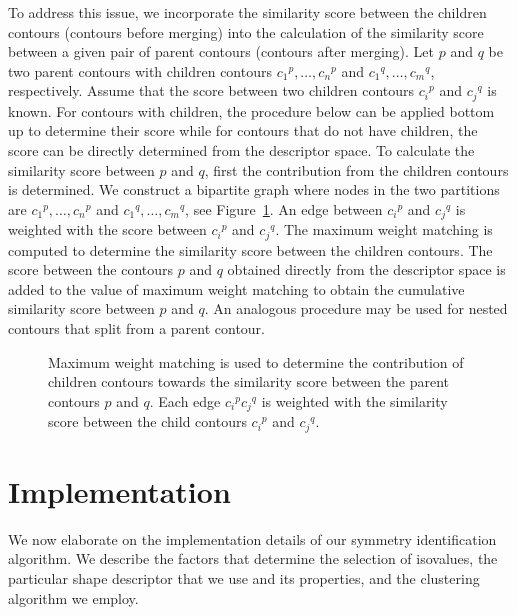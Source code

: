 \documentclass[review,journal]{vgtc}         %
\begin{document}
To address this issue, we incorporate the similarity score between the children contours 
(contours before merging) into the calculation of the similarity score between a given pair
of parent contours (contours after merging). Let $p$ and $q$ be two parent contours
with children contours ${c_1}^p,\dots,{c_n}^p$ and ${c_1}^q,\dots,{c_m}^q$, respectively. 
Assume that the score between two
children contours ${c_i}^p$ and ${c_j}^q$ is known. For contours with children,
the procedure below can be applied bottom up to determine their score
while for contours that do not have children, the score can be directly 
determined from the descriptor space. To calculate the similarity score
between $p$ and $q$, first the contribution from the children contours 
is determined. We construct a bipartite graph where nodes in the two partitions
are ${c_1}^p,\dots,{c_n}^p$ and ${c_1}^q,\dots,{c_m}^q$,
see Figure~\ref{bip}. An edge between ${c_i}^p$ and ${c_j}^q$ is weighted
with the score between ${c_i}^p$ and ${c_j}^q$. The maximum weight
matching is computed to determine the similarity score between the children
contours. The score between the contours $p$ and $q$ obtained
directly from the descriptor space is added to the value of maximum weight matching
to obtain the cumulative similarity score between $p$ and $q$. An analogous procedure
may be used for nested contours that split from a parent contour.
\begin{figure}[b]
\centering
\caption{\label{bip}Maximum weight matching is used to determine the contribution of children
	contours towards the similarity score between the parent contours $p$ and $q$. 
	Each edge ${c_i}^p{c_j}^q$ is weighted with the similarity score between the
	child contours ${c_i}^p$ and ${c_j}^q$.}
\end{figure}
\section{Implementation}
We now elaborate on the implementation details of our symmetry identification algorithm.
We describe the factors that determine the selection of isovalues, the particular shape descriptor
that we use and its properties, and the clustering algorithm we employ.
\end{document}
